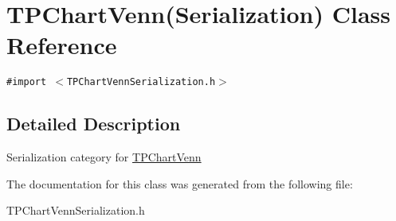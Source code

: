 \hypertarget{interface_t_p_chart_venn_07_serialization_08}{
\section{TPChartVenn(Serialization) Class Reference}
\label{interface_t_p_chart_venn_07_serialization_08}
}
{\tt \#import $<$TPChartVennSerialization.h$>$}



\subsection{Detailed Description}
Serialization category for \hyperlink{interface_t_p_chart_venn}{TPChartVenn} 

The documentation for this class was generated from the following file:\begin{CompactItemize}
\item 
TPChartVennSerialization.h\end{CompactItemize}

